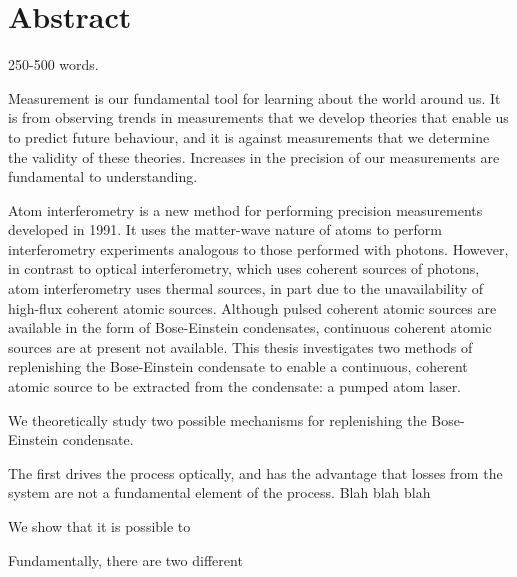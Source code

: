 \chapter*{Abstract}
\graphicspath{{Figures/Common/}}


250-500 words.


Measurement is our fundamental tool for learning about the world around us.  It is from observing trends in measurements that we develop theories that enable us to predict future behaviour, and it is against measurements that we determine the validity of these theories.  Increases in the precision of our measurements are fundamental to understanding.

Atom interferometry is a new method for performing precision measurements developed in 1991.  It uses the matter-wave nature of atoms to perform interferometry experiments analogous to those performed with photons.  However, in contrast to optical interferometry, which uses coherent sources of photons, atom interferometry uses thermal sources, in part due to the unavailability of high-flux coherent atomic sources.  Although pulsed coherent atomic sources are available in the form of Bose-Einstein condensates, continuous coherent atomic sources are at present not available.  This thesis investigates two methods of replenishing the Bose-Einstein condensate to enable a continuous, coherent atomic source to be extracted from the condensate: a pumped atom laser.

We theoretically study two possible mechanisms for replenishing the Bose-Einstein condensate.  



The first drives the process optically, and has the advantage that losses from the system are not a fundamental element of the process.  Blah blah blah


We show that it is possible to 



Fundamentally, there are two different 